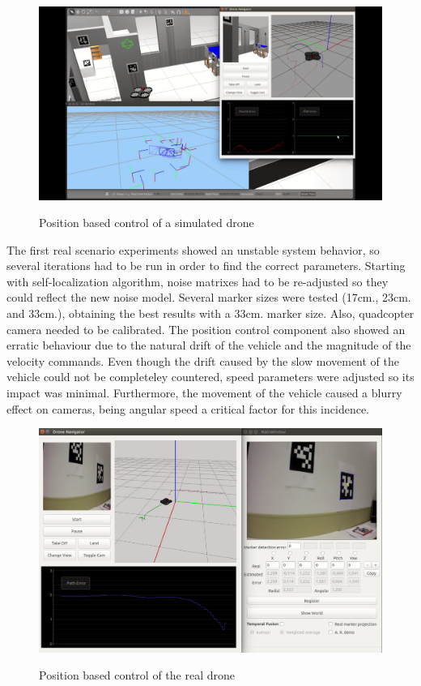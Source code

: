 \documentclass{styles/svproc}
\begin{document}
	\begin{figure}[h]
		\begin{center}
                {\includegraphics[width=12cm]{simnavigation.png}}
		\end{center}
                \label{fig:simnavigation}
		\caption{Position based control of a simulated drone}
	\end{figure}

	The first real scenario experiments showed an unstable system behavior, so several iterations had to be run in order to find the correct parameters. Starting with self-localization algorithm, noise matrixes had to be re-adjusted so they could reflect the new noise model. Several marker sizes were tested (17cm., 23cm.  and 33cm.), obtaining the best results with a 33cm. marker size. Also, quadcopter camera needed to be calibrated. The position control component also showed an erratic behaviour due to the natural drift of the vehicle and the magnitude of the velocity commands. Even though the drift caused by the slow movement of the vehicle could not be completeley countered, speed parameters were adjusted so its impact was minimal. Furthermore, the movement of the vehicle caused a blurry effect on cameras, being angular speed a critical factor for this incidence.
	
	\begin{figure}[h]
		\begin{center}
		{\includegraphics[width=12cm]{appcapture.png}}
		\end{center}
		\caption{Position based control of the real drone}
	\end{figure}
\end{document}
